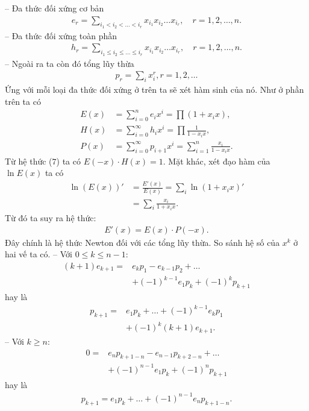 \begin{multicols}{2}
	\vskip 0.1cm
	-- Đa thức đối xứng cơ bản
	\begin{align*}
		e_r=\sum_{i_1<i_2<\ldots<i_r}x_{i_1}x_{i_2}\ldots x_{i_r},\quad r=1,2,\ldots, n.
	\end{align*}
	-- Đa thức đối xứng toàn phần
	\begin{align*}
		h _r=\sum_{i_1\le i_2\le \ldots \le i_r}x_{i_1}x_{i_2}\ldots x_{i_r},\quad r=1,2,\ldots,n.
	\end{align*}
	-- Ngoài ra ta còn đó tổng lũy thừa 
	\begin{align*}
		p_r=\sum_i x_i^r, r=1,2,\ldots
	\end{align*}
	Ứng với mỗi loại đa thức đối xứng ở trên ta sẽ xét hàm sinh của nó. Như ở phần trên ta có
	\begin{align*}
		E(x)&=\sum_{i=0}^n e_ix^i=\prod(1+x_ix),\\
		H(x)&=\sum_{i=0}^\infty h_i x^i=\prod\frac1{1-x_i x},\\
		P(x)&= \sum_{i=0}^\infty p_{i+1} x^{i}=\sum_{i=1}^n \frac {x_i}{1-x_i x}.
	\end{align*}	
	Từ hệ thức ($7$) ta có  $E(-x)\cdot H(x)=1$.
	\vskip 0.1cm
	Mặt khác, xét đạo hàm của $\ln E(x)$ ta có
	\begin{align*}
		\ln(E(x))'&=\frac{E'(x)}{E(x)}= \sum_i\ln\left({1+x_i x}\right)'\\
		&=\sum_i\frac{x_i}{1+x_i x}.
	\end{align*}
	Từ đó ta suy ra hệ thức:
	\begin{align*}
		E'(x)=E(x)\cdot P(-x).
	\end{align*}
	Đây chính là { hệ thức Newton} đối với các tổng lũy thừa.   
	So sánh hệ số của $x^{k}$ ở hai vế ta có.
	\vskip 0.1cm
	-- Với $0\leq k\leq n-1$:
	\begin{align*}
		(k+1)e_{k+1}=&e_kp_1-e_{k-1}p_2+\ldots\\
		&+(-1)^{k-1} e_1p_k+(-1)^{k}p_{k+1}
	\end{align*}
	hay là 
	\begin{align*}
		p_{k+1}=&e_1p_k+\ldots+(-1)^{k-1}e_kp_1\\
		&+(-1)^{k}(k+1)e_{k+1}.
	\end{align*}
	-- Với $k\geq n$:
	\begin{align*}
		0=&e_np_{k+1-n}-e_{n-1}p_{k+2-n}+\ldots\\
		&+(-1)^{n-1} e_1p_k+(-1)^{n}p_{k+1}
	\end{align*}
	hay là 
	\begin{align*}
		p_{k+1}=e_1p_k+\ldots+(-1)^{n-1}e_np_{k+1-n}.
	\end{align*}

\end{multicols}
